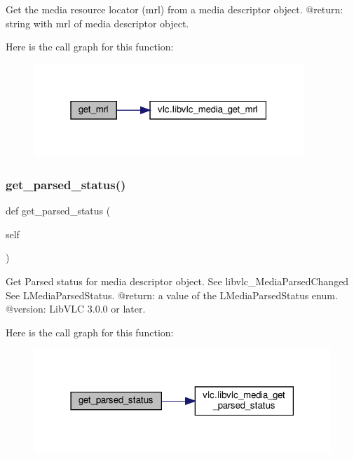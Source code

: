 \begin{DoxyVerb}Get the media resource locator (mrl) from a media descriptor object.
@return: string with mrl of media descriptor object.
\end{DoxyVerb}
 Here is the call graph for this function\+:
\nopagebreak
\begin{figure}[H]
\begin{center}
\leavevmode
\includegraphics[width=289pt]{classvlc_1_1_media_ad16baf151ea7a01a45c3c343700f9bb6_cgraph}
\end{center}
\end{figure}
\mbox{\label{classvlc_1_1_media_a22e2664718e78b59bc29672bbc486889}} 
\subsubsection{\texorpdfstring{get\+\_\+parsed\+\_\+status()}{get\_parsed\_status()}}
{\footnotesize\ttfamily def get\+\_\+parsed\+\_\+status (\begin{DoxyParamCaption}\item[{}]{self }\end{DoxyParamCaption})}

\begin{DoxyVerb}Get Parsed status for media descriptor object.
See libvlc_MediaParsedChanged
See L{MediaParsedStatus}.
@return: a value of the L{MediaParsedStatus} enum.
@version: LibVLC 3.0.0 or later.
\end{DoxyVerb}
 Here is the call graph for this function\+:
\nopagebreak
\begin{figure}[H]
\begin{center}
\leavevmode
\includegraphics[width=318pt]{classvlc_1_1_media_a22e2664718e78b59bc29672bbc486889_cgraph}
\end{center}
\end{figure}
\mbox{\label{classvlc_1_1_media_adf1f4fd59e6ea40d38c2b677a757007f}} 
